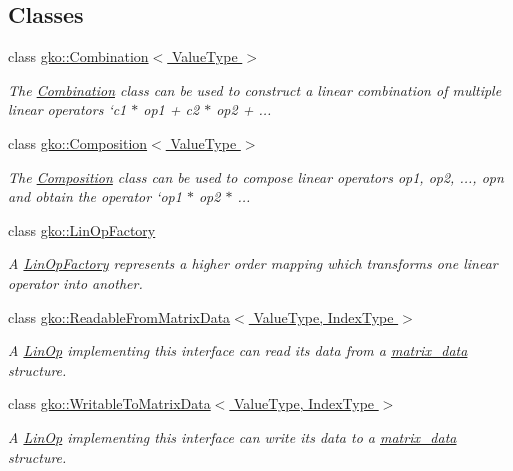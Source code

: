 \subsection*{Classes}
\begin{DoxyCompactItemize}
\item 
class \hyperlink{classgko_1_1Combination}{gko\+::\+Combination$<$ Value\+Type $>$}
\begin{DoxyCompactList}\small\item\em The \hyperlink{classgko_1_1Combination}{Combination} class can be used to construct a linear combination of multiple linear operators `c1 $\ast$ op1 + c2 $\ast$ op2 + ... \end{DoxyCompactList}\item 
class \hyperlink{classgko_1_1Composition}{gko\+::\+Composition$<$ Value\+Type $>$}
\begin{DoxyCompactList}\small\item\em The \hyperlink{classgko_1_1Composition}{Composition} class can be used to compose linear operators {\ttfamily op1, op2, ..., opn} and obtain the operator `op1 $\ast$ op2 $\ast$ ... \end{DoxyCompactList}\item 
class \hyperlink{classgko_1_1LinOpFactory}{gko\+::\+Lin\+Op\+Factory}
\begin{DoxyCompactList}\small\item\em A \hyperlink{classgko_1_1LinOpFactory}{Lin\+Op\+Factory} represents a higher order mapping which transforms one linear operator into another. \end{DoxyCompactList}\item 
class \hyperlink{classgko_1_1ReadableFromMatrixData}{gko\+::\+Readable\+From\+Matrix\+Data$<$ Value\+Type, Index\+Type $>$}
\begin{DoxyCompactList}\small\item\em A \hyperlink{classgko_1_1LinOp}{Lin\+Op} implementing this interface can read its data from a \hyperlink{structgko_1_1matrix__data}{matrix\+\_\+data} structure. \end{DoxyCompactList}\item 
class \hyperlink{classgko_1_1WritableToMatrixData}{gko\+::\+Writable\+To\+Matrix\+Data$<$ Value\+Type, Index\+Type $>$}
\begin{DoxyCompactList}\small\item\em A \hyperlink{classgko_1_1LinOp}{Lin\+Op} implementing this interface can write its data to a \hyperlink{structgko_1_1matrix__data}{matrix\+\_\+data} structure. \end{DoxyCompactList}\item 

\end{DoxyCompactItemize}

